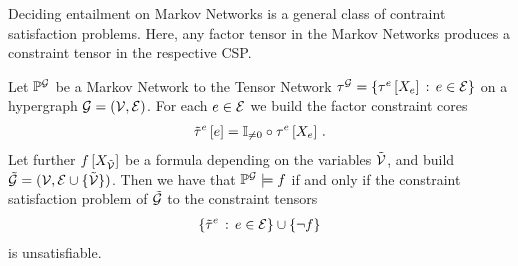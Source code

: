 
Deciding entailment on Markov Networks is a general class of contraint satisfaction problems.
Here, any factor tensor in the Markov Networks produces a constraint tensor in the respective CSP.

\begin{theorem}
    \label{the:factorReduction}
    Let $\mathbb{P}^{\mathcal{G}}$ be a Markov Network to the Tensor Network $\tau^{\mathcal{G}}=\left\{\tau^{e}\left[X_{e}\right]\, : \, e\in\mathcal{E}\right\}$ on a hypergraph $\mathcal{G}=(\mathcal{V},\mathcal{E})$. %
    For each $e\in\mathcal{E}$ we build the factor constraint cores
    \begin{align*}
        \tilde{\tau}^{e}\left[e\right] = \mathbb{I}_{\neq0}\circ\tau^{e}\left[X_{e}\right] \, .
    \end{align*}
    Let further $f\left[X_{\tilde{\mathcal{V}}}\right]$ be a formula depending on the variables $\tilde{\mathcal{V}}$, and build $\tilde{\mathcal{G}}=(\mathcal{V},\mathcal{E}\cup\{\tilde{\mathcal{V}}\})$.
    Then we have that $\mathbb{P}^{\mathcal{G}}\models f$ if and only if the constraint satisfaction problem of $\tilde{\mathcal{G}}$ to the constraint tensors
    \begin{align*}
        \{\tilde{\tau}^{e} \, : \, e\in\mathcal{E} \} \cup \{\lnot f \}
    \end{align*}
    is unsatisfiable.
\end{theorem}
